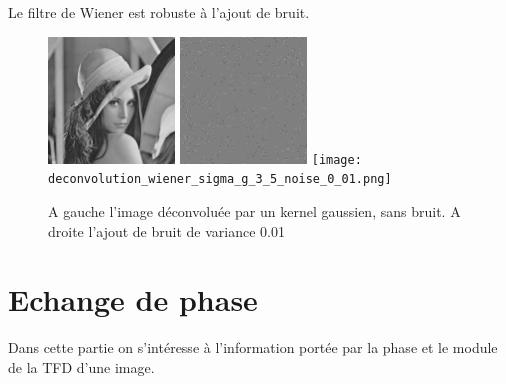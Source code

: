 \documentclass{article}
\begin{document}
Le filtre de Wiener est robuste à l'ajout de bruit.

\begin{figure}[h]
	\includegraphics[width=0.3\textwidth]{deconvolution_sigma_1.png}
	\includegraphics[width=0.3\textwidth]{deconvolution_sigma_1_noise_0_01.png}
	\texttt{[image: deconvolution\_wiener\_sigma\_g\_3\_5\_noise\_0\_01.png]}

  \caption{A gauche l'image déconvoluée par un kernel gaussien, sans bruit. A droite l'ajout de bruit de variance 0.01}
\end{figure}

\section{Echange de phase}

Dans cette partie on s'intéresse à l'information portée par la phase et le module de la TFD d'une image. 
\end{document}
